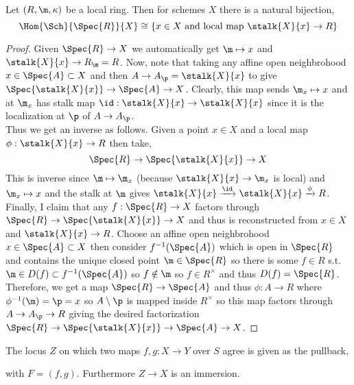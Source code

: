 \documentclass[12pt]{article}
\begin{document}
\begin{lemma}
Let $(R, \m, \kappa)$ be a local ring. Then for schemes $X$ there is a natural bijection,
\[ \Hom{\Sch}{\Spec{R}}{X} \cong \{ x \in X \text{ and local map } \stalk{X}{x} \to R \} \]
\end{lemma}

\begin{proof}
Given $\Spec{R} \to X$ we automatically get $\m \mapsto x$ and $\stalk{X}{x} \to R_\m = R$. 
Now, note that taking any affine open neighbrohood $x \in \Spec{A} \subset X$ and then $A \to A_\p = \stalk{X}{x}$ to give $\Spec{\stalk{X}{x}} \to \Spec{A} \to X$. Clearly, this map sends $\m_x \mapsto x$ and at $\m_x$ has stalk map $\id : \stalk{X}{x} \to \stalk{X}{x}$ since it is the localization at $\p$ of $A \to A_\p$. 
\bigskip\\
Thus we get an inverse as follows. Given a point $x \in X$ and a local map $\phi : \stalk{X}{x} \to R$ then take,
\[ \Spec{R} \to \Spec{\stalk{X}{x}} \to X \]
This is inverse since $\m \mapsto \m_x$ (because $\stalk{X}{x} \to \m_x$ is local) and $\m_x \mapsto x$ and the stalk at $\m$ gives $\stalk{X}{x} \xrightarrow{\id} \stalk{X}{x} \xrightarrow{\phi} R$. 
\bigskip\\
Finally, I claim that any $f : \Spec{R} \to X$ factors through $\Spec{R} \to \Spec{\stalk{X}{x}} \to X$ and thus is reconstructed from $x \in X$ and $\stalk{X}{x} \to R$. Choose an affine open neighbrohood $x \in \Spec{A} \subset X$ then consider $f^{-1}(\Spec{A})$ which is open in $\Spec{R}$ and contains the unique closed point $\m \in \Spec{R}$ so there is some $f \in R$ s.t. $\m \in D(f) \subset f^{-1}(\Spec{A})$ so $f \notin \m$ so $f \in R^\times$ and thus $D(f) = \Spec{R}$. Therefore, we get a map $\Spec{R} \to \Spec{A}$ and thus $\phi : A \to R$ where $\phi^{-1}(\m) = \p = x$ so $A \setminus \p$ is mapped inside $R^\times$ so this map factors through $A \to A_\p \to R$ giving the desired factorization $\Spec{R} \to \Spec{\stalk{X}{x}} \to \Spec{A} \to X$.  
\end{proof}

\begin{definition}
The locus $Z$ on which two maps $f, g : X \to Y$ over $S$ agree is given as the pullback,
\begin{center}
\end{center}
with $F = (f, g)$. Furthermore $Z \to X$ is an immersion. 
\end{definition}
\end{document}
